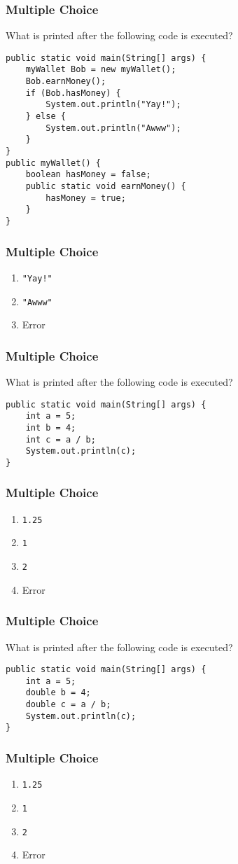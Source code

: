 \documentclass[9pt]{beamer}
\begin{document}
\begin{frame}[fragile]
  \frametitle{Multiple Choice}
  What is printed after the following code is executed?

  \begin{lstlisting}
public static void main(String[] args) {
    myWallet Bob = new myWallet();
    Bob.earnMoney();
    if (Bob.hasMoney) {
        System.out.println("Yay!");
    } else {
        System.out.println("Awww");
    }
}
public myWallet() {
    boolean hasMoney = false;
    public static void earnMoney() {
        hasMoney = true;
    }
}
  \end{lstlisting}
\end{frame}
\begin{frame}[fragile]
  \frametitle{Multiple Choice}
  \begin{enumerate}
    \item
      {\tt "Yay!"}
    \item
      {\tt "Awww"}
    \item
      \alert<2>{Error}
  \end{enumerate}
\end{frame}

\begin{frame}[fragile]
  \frametitle{Multiple Choice}
  What is printed after the following code is executed?

  \begin{lstlisting}
public static void main(String[] args) {
    int a = 5;
    int b = 4;
    int c = a / b;
    System.out.println(c);
}
  \end{lstlisting}
\end{frame}
\begin{frame}[fragile]
  \frametitle{Multiple Choice}
  \begin{enumerate}
    \item
      {\tt 1.25}
    \item
      \alert<2>{{\tt 1}}
    \item
      {\tt 2}
    \item
      Error
  \end{enumerate}
\end{frame}

\begin{frame}[fragile]
  \frametitle{Multiple Choice}
  What is printed after the following code is executed?

  \begin{lstlisting}
public static void main(String[] args) {
    int a = 5;
    double b = 4;
    double c = a / b;
    System.out.println(c);
}
  \end{lstlisting}
\end{frame}
\begin{frame}[fragile]
  \frametitle{Multiple Choice}
  \begin{enumerate}
    \item
      \alert<2>{\tt 1.25}
    \item
      {\tt 1}
    \item
      {\tt 2}
    \item
      Error
  \end{enumerate}
\end{frame}
\end{document}
